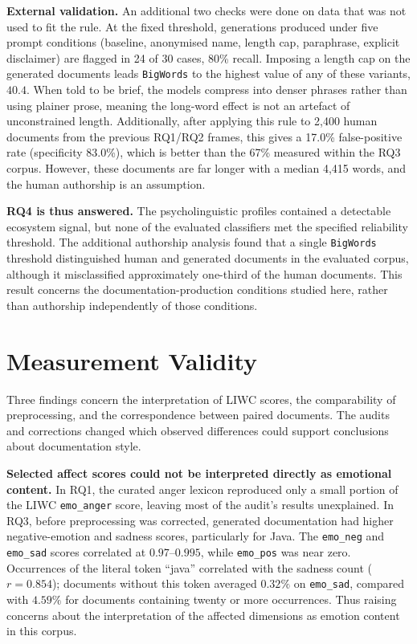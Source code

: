 \documentclass[conference]{IEEEtran}
\begin{document}
\textbf{External validation.} An additional two checks were done on data that was not used to fit the rule. At the
fixed threshold, generations produced under five prompt conditions (baseline, anonymised name, length cap, paraphrase, explicit disclaimer) are flagged in 24 of 30 cases, 80\% recall. Imposing a length cap on the generated documents leads \texttt{BigWords} to the highest value of any of these variants, $40.4$. When told to be brief, the models compress into denser phrases rather than using plainer prose, meaning the long-word effect is not an artefact of unconstrained length. Additionally, after applying this rule to 2{,}400 human documents from the previous RQ1/RQ2 frames, this gives a 17.0\% false-positive rate (specificity 83.0\%), which is better than the 67\% measured within the RQ3 corpus. However, these documents are far longer with a median 4{,}415 words, and the human authorship is an assumption.

\textbf{RQ4 is thus answered.} The psycholinguistic profiles contained a detectable ecosystem signal, but none of the evaluated classifiers met the specified reliability threshold. The additional authorship analysis found that a single \texttt{BigWords} threshold distinguished human and generated documents in the evaluated corpus, although it misclassified approximately one-third of the human documents. This result concerns the documentation-production conditions studied here, rather than authorship independently of those conditions.

\section{Measurement Validity}
\label{sec:results-method-findings}

Three findings concern the interpretation of LIWC scores, the comparability of preprocessing, and the correspondence between paired documents. The audits and corrections changed which observed differences could support conclusions about documentation style.

\textbf{Selected affect scores could not be interpreted directly as emotional content.} In RQ1, the curated anger lexicon reproduced only a small portion of the LIWC \texttt{emo\_anger} score, leaving most of the audit's results unexplained. In RQ3, before preprocessing was corrected, generated documentation had higher negative-emotion and sadness scores, particularly for Java. The \texttt{emo\_neg} and \texttt{emo\_sad} scores correlated at $0.97$--$0.995$, while \texttt{emo\_pos} was near zero. Occurrences of the literal token ``java'' correlated with the sadness count ($r = 0.854$); documents without this token averaged $0.32\%$ on \texttt{emo\_sad}, compared with $4.59\%$ for documents containing twenty or more occurrences. Thus raising concerns about the interpretation of the affected dimensions as emotion content in this corpus.
\end{document}
